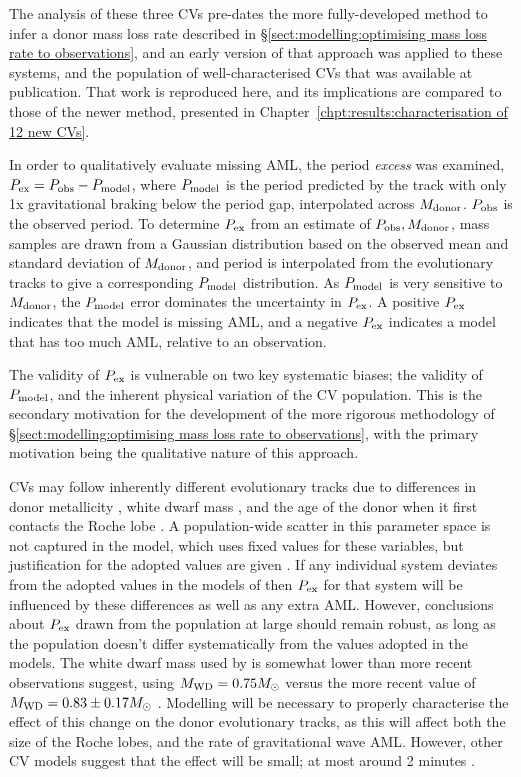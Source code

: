 The analysis of these three CVs pre-dates the more fully-developed method to infer a donor mass loss rate described in \S\ref{sect:modelling:optimising mass loss rate to observations}, and an early version of that approach was applied to these systems, and the population of well-characterised CVs that was available at publication. That work is reproduced here, and its implications are compared to those of the newer method, presented in Chapter~\ref{chpt:results:characterisation of 12 new CVs}.

In order to qualitatively evaluate missing AML, the period \textit{excess} was examined, $P_{\rm ex} = P_{\rm obs} - P_{\rm model}$, where $P_{\rm model}$ is the period predicted by the \citet{knigge11} track with only 1x gravitational braking below the period gap, interpolated across $M_{\rm donor}$. $P_{\rm obs}$ is the observed period.
To determine $P_{\rm ex}$ from an estimate of $P_{\rm obs}, M_{\rm donor}$, mass samples are drawn from a Gaussian distribution based on the observed mean and standard deviation of $M_{\rm donor}$, and period is interpolated from the evolutionary tracks to give a corresponding $P_{\rm model}$ distribution. As $P_{\rm model}$ is very sensitive to $M_{\rm donor}$, the $P_{\rm model}$ error dominates the uncertainty in $P_{\rm ex}$.
A positive $P_{\rm ex}$ indicates that the model is missing AML, and a negative $P_{\rm ex}$ indicates a model that has too much AML, relative to an observation.

The validity of $P_{\rm ex}$ is vulnerable on two key systematic biases; the validity of $P_{\rm model}$, and the inherent physical variation of the CV population. This is the secondary motivation for the development of the more rigorous methodology of \S\ref{sect:modelling:optimising mass loss rate to observations}, with the primary motivation being the qualitative nature of this approach.

CVs may follow inherently different evolutionary tracks due to differences in donor metallicity \citep{stehle1997, harrison2016}, white dwarf mass \citep{knigge2006}, and the age of the donor when it first contacts the Roche lobe \citep{howell2001}. A population-wide scatter in this parameter space is not captured in the \citet{knigge11} model, which uses fixed values for these variables, but justification for the adopted values are given \citep{knigge11, knigge2006}.
If any individual system deviates from the adopted values in the models of \citet{knigge11} then $P_{\rm ex}$ for that system will be influenced by these differences as well as any extra AML. However, conclusions about $P_{\rm ex}$ drawn from the population at large should remain robust, as long as the population doesn't differ systematically from the values adopted in the models. The white dwarf mass used by \citet{knigge11} is somewhat lower than more recent observations suggest, using $M_{\rm WD} = 0.75 M_\odot$ versus the more recent value of $M_{\rm WD} = 0.83 \pm 0.17 M_\odot$ \citep{pala2020}. Modelling will be necessary to properly characterise the effect of this change on the donor evolutionary tracks, as this will affect both the size of the Roche lobes, and the rate of gravitational wave AML. However, other CV models suggest that the effect will be small; at most around 2 minutes \citep{goliasch2015}.

